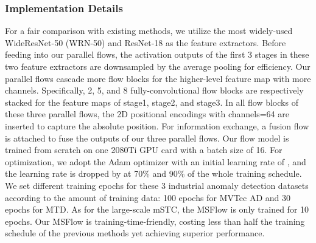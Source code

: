 \documentclass[lettersize,journal]{IEEEtran}
\begin{document}
\subsubsection{Implementation Details}
For a fair comparison with existing methods, we utilize the most widely-used WideResNet-50 (WRN-50) \cite{zagoruyko2016wide} and ResNet-18 \cite{he2016resnet} as the feature extractors.
Before feeding into our parallel flows, the activation outputs of the first 3 stages in these two feature extractors are downsampled by the average pooling for efficiency.
Our parallel flows cascade more flow blocks for the higher-level feature map with more channels. Specifically, 2, 5, and 8 fully-convolutional flow blocks are respectively stacked for the feature maps of stage1, stage2, and stage3. In all flow blocks of these three parallel flows, the 2D positional encodings with channels=64 are inserted to capture the absolute position. For information exchange, a fusion flow is attached to fuse the outputs of our three parallel flows. 
Our flow model is trained from scratch on one 2080Ti GPU card with a batch size of 16. For optimization, we adopt the Adam optimizer with an initial learning rate of , and the learning rate is dropped by  at 70\% and 90\% of the whole training schedule. We set different training epochs for these 3 industrial anomaly detection datasets according to the amount of training data: 100 epochs for MVTec AD and 30 epochs for MTD. As for the large-scale mSTC, the MSFlow is only trained for 10 epochs. 
Our MSFlow is training-time-friendly, costing less than half the training schedule of the previous methods \cite{gudovskiy2022cflow,rudolph2022csflow,rudolph2021differnet} yet achieving superior performance.
\end{document}

